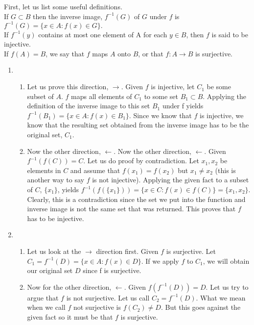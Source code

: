 \documentclass[12pt,letterpaper,boxed]{hmcpset}
\begin{document}
\begin{solution}
First, let us list some useful definitions.\\
If $G \subset B$ then the inverse image, $f^{-1}(G)$ of $G$ under $f$ is $f^{-1}(G)=\{x \in A : f(x) \in G\}.$
\\ If $f^{-1}(y)$ contains at most one element of A for each $y \in B$, then $f$ is said to be injective. 
\\ If $f(A) = B$, we say that $f$ maps $A$ onto $B$, or that $f : A \rightarrow B$ is surjective.\newline

\begin{enumerate}
	\itemsep0em
	\item
	\begin{enumerate}
		\itemsep0em
		\item Let us prove this direction, $\rightarrow$. Given $f$ is injective, let $C_1$ be some subset of $A$. $f$ maps all elements of $C_1$ to some set $B_1 \subset B$. Applying the definition of the inverse image to this set $B_1$ under f yields $f^{-1}(B_1)=\{x \in A:f(x)\in B_1\}.$ Since we know that $f$ is injective, we know that the resulting set obtained from the inverse image has to be the original set, $C_1$.
		\item Now the other direction, $\leftarrow$. Now the other direction, $\leftarrow$. Given $f^{-1}(f(C))=C$. Let us do proof by contradiction. Let $x_1, x_2$ be elements in $C$ and assume that $f(x_1)=f(x_2)$ but $x_1 \neq x_2$ (this is another way to say $f$ is not injective). Applying the given fact to a subset of $C$, $\{x_1\}$, yields $f^{-1}(f(\{x_1\}))=\{x \in C:f(x)\in f(C)\} = \{x_1, x_2\}$. Clearly, this is a contradiction since the set we put into the function and inverse image is not the same set that was returned. This proves that $f$ has to be injective.
	\end{enumerate}

	\item
	\begin{enumerate}
		\itemsep0em
	\item  Let us look at the $\rightarrow$ direction first. Given $f$ is surjective. Let $C_1 = f^{-1}(D)=\{x \in A : f(x) \in D\}.$ If we apply $f$ to $C_1$, we will obtain our original set $D$ since f is surjective.
	\item Now for the other direction, $\leftarrow$. Given $f(f^{-1}(D)) = D$. Let us try to argue that $f$ is not surjective. Let us call $C_2 = f^{-1}(D)$. What we mean when we call $f$ not surjective is $f(C_2)\neq D$. But this goes against the given fact so it must be that $f$ is surjective.
	\end{enumerate}
\end{enumerate}
\end{solution}
\end{document}

